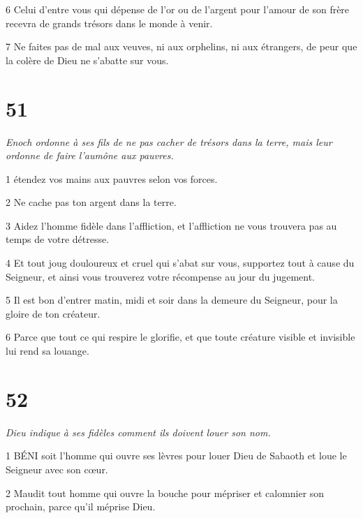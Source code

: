 \par 6 Celui d'entre vous qui dépense de l'or ou de l'argent pour l'amour de son frère recevra de grands trésors dans le monde à venir.

\par 7 Ne faites pas de mal aux veuves, ni aux orphelins, ni aux étrangers, de peur que la colère de Dieu ne s'abatte sur vous.

\chapter{51}

\par \textit{Enoch ordonne à ses fils de ne pas cacher de trésors dans la terre, mais leur ordonne de faire l'aumône aux pauvres.}

\par 1 étendez vos mains aux pauvres selon vos forces.

\par 2 Ne cache pas ton argent dans la terre.

\par 3 Aidez l'homme fidèle dans l'affliction, et l'affliction ne vous trouvera pas au temps de votre détresse.

\par 4 Et tout joug douloureux et cruel qui s'abat sur vous, supportez tout à cause du Seigneur, et ainsi vous trouverez votre récompense au jour du jugement.

\par 5 Il est bon d'entrer matin, midi et soir dans la demeure du Seigneur, pour la gloire de ton créateur.

\par 6 Parce que tout ce qui respire le glorifie, et que toute créature visible et invisible lui rend sa louange.

\chapter{52}

\par \textit{Dieu indique à ses fidèles comment ils doivent louer son nom.}

\par 1 BÉNI soit l'homme qui ouvre ses lèvres pour louer Dieu de Sabaoth et loue le Seigneur avec son cœur.

\par 2 Maudit tout homme qui ouvre la bouche pour mépriser et calomnier son prochain, parce qu'il méprise Dieu.

